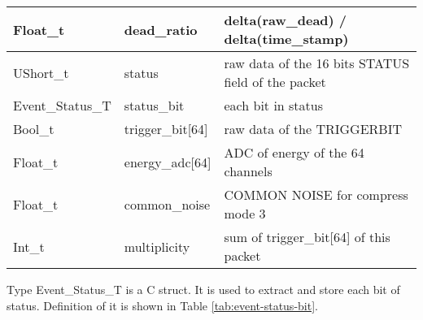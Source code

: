 \documentclass[a4paper, 12pt, onecolumn]{article}
\begin{document}
\begin{center}
\begin{mpsupertabular}{| p{28mm} | p{25mm} | p{70mm} |}
    Float\_t           & dead\_ratio         & delta(raw\_dead) / delta(time\_stamp) \\\hline
    UShort\_t          & status              & raw data of the 16 bits STATUS field of the packet \\\hline
    Event\_Status\_T   & status\_bit         & each bit in status \\\hline
    Bool\_t            & trigger\_bit[64]    & raw data of the TRIGGERBIT \\\hline
    Float\_t           & energy\_adc[64]     & ADC of energy of the 64 channels \\\hline
    Float\_t           & common\_noise       & COMMON NOISE for compress mode 3 \\\hline
    Int\_t             & multiplicity        & sum of trigger\_bit[64] of this packet \\
  \end{mpsupertabular}
\end{center}

Type Event\_Status\_T is a C struct. It is used to extract and store each bit of status. Definition of it is shown in Table \ref{tab:event-status-bit}.
\end{document}
